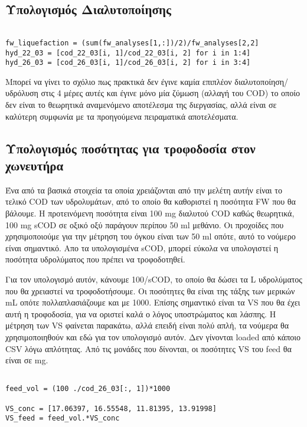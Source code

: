 \documentclass[11pt]{article}
\begin{document}
\subsection{Υπολογισμός Διαλυτοποίησης}
\label{sec:org8a98dc7}
\begin{verbatim}

fw_liquefaction = (sum(fw_analyses[1,:])/2)/fw_analyses[2,2]
hyd_22_03 = [cod_22_03[i, 1]/cod_22_03[i, 2] for i in 1:4]
hyd_26_03 = [cod_26_03[i, 1]/cod_26_03[i, 2] for i in 3:4]

\end{verbatim}

Μπορεί να γίνει το σχόλιο πως πρακτικά δεν έγινε καμία επιπλέον διαλυτοποίηση/υδρόλυση στις 4 μέρες αυτές και έγινε μόνο μία ζύμωση (αλλαγή του COD) το οποίο δεν είναι το θεωρητικά αναμενόμενο αποτέλεσμα της διεργασίας, αλλά είναι σε καλύτερη συμφωνία με τα προηγούμενα πειραματικά αποτελέσματα.

\subsection{Υπολογισμός ποσότητας για τροφοδοσία στον χωνευτήρα}
\label{sec:orgde1155b}
Ένα από τα βασικά στοιχεία τα οποία χρειάζονται από την μελέτη αυτήν είναι το τελικό COD των υδρολυμάτων, από το οποίο θα καθοριστεί η ποσότητα FW που θα βάλουμε. Η προτεινόμενη ποσότητα είναι 100 mg διαλυτού COD καθώς θεωρητικά, 100 mg sCOD σε οξικό οξύ παράγουν περίπου 50 ml μεθάνιο. Οι προχοίδες που χρησιμοποιούμε για την μέτρηση του όγκου είναι των 50 ml οπότε, αυτό το νούμερο είναι σημαντικό. Απο τα υπολογισμένα sCOD, μπορεί εύκολα να υπολογιστεί η ποσότητα υδρολύματος που πρέπει να τροφοδοτηθεί.

Για τον υπολογισμό αυτόν, κάνουμε 100/sCOD, το οποίο θα δώσει τα L υδρολύματος που θα χρειαστεί να τροφοδοτήσουμε. Οι ποσότητες θα είναι της τάξης των μερικών mL οπότε πολλαπλασιάζουμε και με 1000. Επίσης σημαντικό είναι τα VS που θα έχει αυτή η τροφοδοσία, για να οριστεί καλά ο λόγος υποστρώματος και λάσπης. Η μέτρηση των VS φαίνεται παρακάτω, αλλά επειδή είναι πολύ απλή, τα νούμερα θα χρησιμοποιηθούν και εδώ για τον υπολογισμό αυτόν. Δεν γίνονται loaded από κάποιο CSV λόγω απλότητας. Από τις μονάδες που δίνονται, οι ποσότητες VS του feed θα είναι σε mg.

\begin{verbatim}

feed_vol = (100 ./cod_26_03[:, 1])*1000

VS_conc = [17.06397, 16.55548, 11.81395, 13.91998]
VS_feed = feed_vol.*VS_conc
\end{verbatim}
\end{document}
